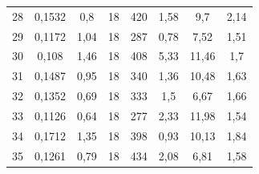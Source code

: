 \documentclass[12pt,a4paper]{article}
\begin{document}
\begin{table}[]
{\begin{tabular}{|c|c|c|c|c|c|c|c|}
    28                       & 0,1532                 & 0,8                        & 18                                         & 420                       & 1,58                                            & 9,7                                      & 2,14                                  \\
    29                       & 0,1172                 & 1,04                       & 18                                         & 287                       & 0,78                                            & 7,52                                     & 1,51                                  \\
    30                       & 0,108                  & 1,46                       & 18                                         & 408                       & 5,33                                            & 11,46                                    & 1,7                                   \\
    31                       & 0,1487                 & 0,95                       & 18                                         & 340                       & 1,36                                            & 10,48                                    & 1,63                                  \\
    32                       & 0,1352                 & 0,69                       & 18                                         & 333                       & 1,5                                             & 6,67                                     & 1,66                                  \\
    33                       & 0,1126                 & 0,64                       & 18                                         & 277                       & 2,33                                            & 11,98                                    & 1,54                                  \\
    34                       & 0,1712                 & 1,35                       & 18                                         & 398                       & 0,93                                            & 10,13                                    & 1,84                                  \\
    35                       & 0,1261                 & 0,79                       & 18                                         & 434                       & 2,08                                            & 6,81                                     & 1,58                                  \\

\end{tabular}}
\end{table}
\end{document}
